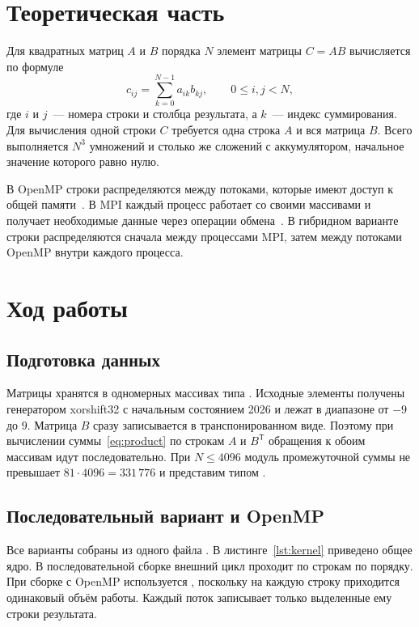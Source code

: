 \section{Теоретическая часть}

Для квадратных матриц $A$ и $B$ порядка $N$ элемент матрицы $C=AB$ вычисляется по формуле
\begin{equation}
c_{ij}=\sum_{k=0}^{N-1} a_{ik}b_{kj},\qquad 0\le i,j<N,
\label{eq:product}
\end{equation}
где $i$ и $j$~--- номера строки и столбца результата, а $k$~--- индекс суммирования. Для вычисления одной строки $C$ требуется одна строка $A$ и вся матрица $B$. Всего выполняется $N^3$ умножений и столько же сложений с аккумулятором, начальное значение которого равно нулю.

В OpenMP строки распределяются между потоками, которые имеют доступ к общей памяти~\cite{openmp}. В MPI каждый процесс работает со своими массивами и получает необходимые данные через операции обмена~\cite{mpi}. В гибридном варианте строки распределяются сначала между процессами MPI, затем между потоками OpenMP внутри каждого процесса.

\section{Ход работы}

\subsection{Подготовка данных}

Матрицы хранятся в одномерных массивах типа . Исходные элементы получены генератором xorshift32 с начальным состоянием 2026 и лежат в диапазоне от $-9$ до $9$. Матрица $B$ сразу записывается в транспонированном виде. Поэтому при вычислении суммы~\eqref{eq:product} по строкам $A$ и $B^\mathsf{T}$ обращения к обоим массивам идут последовательно. При $N\le4096$ модуль промежуточной суммы не превышает $81\cdot4096=331\,776$ и представим типом .

\clearpage
\subsection{Последовательный вариант и OpenMP}

Все варианты собраны из одного файла . В листинге~\ref{lst:kernel} приведено общее ядро. В последовательной сборке внешний цикл проходит по строкам по порядку. При сборке с OpenMP используется , поскольку на каждую строку приходится одинаковый объём работы. Каждый поток записывает только выделенные ему строки результата.

